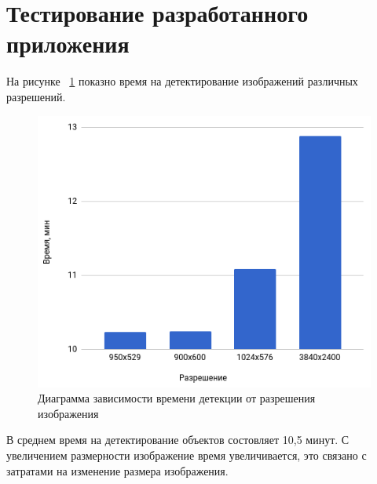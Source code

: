 \documentclass[a4paper,english,russian]{G2-105}
\begin{document}
\section{Тестирование разработанного приложения}
\par На рисунке ~\ref{timedetection} показно время на детектирование изображений различных разрешений.
\begin{figure}
    \includegraphics[width=0.6\linewidth]{timedetection.png}
    \caption{Диаграмма зависимости времени детекции от разрешения изображения}
	\label{timedetection}
\end{figure}
\par В среднем время на детектирование объектов состовляет 10,5 минут. С увеличением размерности изображение время увеличивается, это связано с затратами на изменение размера изображения.
\end{document}
